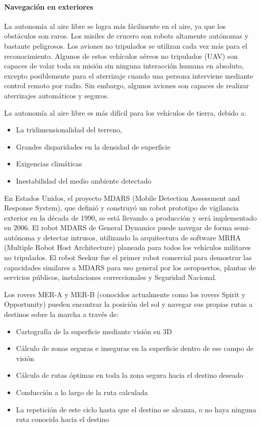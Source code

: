 \paragraph{Navegación en exteriores}
La autonomía al aire libre se logra más fácilmente en el aire, ya que los obstáculos son raros. Los misiles de crucero son robots altamente autónomas y bastante peligrosos. Los aviones no tripulados se utilizan cada vez más para el reconocimiento. Algunos de estos vehículos aéreos no tripulados (UAV) son capaces de volar toda su misión sin ninguna interacción humana en absoluto, excepto posiblemente para el aterrizaje cuando una persona interviene mediante control remoto por radio. Sin embargo, algunos aviones son capaces de realizar aterrizajes automáticos y seguros.

La autonomía al aire libre es más difícil para los vehículos de tierra, debido a:

\begin{itemize}
	\itemsep1pt \parskip1pt 
	\item La tridimensionalidad del terreno,
	\item Grandes disparidades en la densidad de superficie
	\item Exigencias climáticas
	\item Inestabilidad del medio ambiente detectado
\end{itemize}

En Estados Unidos, el proyecto MDARS (Mobile Detection Assessment and Response System), que definió y construyó un robot prototipo de vigilancia exterior en la década de 1990, se está llevando a producción y será implementado en 2006. El robot MDARS de General Dynamics puede navegar de forma semi-autónoma y detectar intrusos, utilizando la arquitectura de software MRHA (Multiple Robot Host Architecture) planeada para todos los vehículos militares no tripulados. El robot Seekur fue el primer robot comercial para demostrar las capacidades similares a MDARS para uso general por los aeropuertos, plantas de servicios públicos, instalaciones correccionales y Seguridad Nacional.

Los rovers MER-A y MER-B (conocidos actualmente como los rovers Spirit y Opportunity) pueden encontrar la posición del sol y navegar sus propias rutas a destinos sobre la marcha a través de:

\begin{itemize}
	\itemsep1pt \parskip1pt 
	\item Cartografía de la superficie mediante visión en 3D
	\item Cálculo de zonas seguras e inseguras en la superficie dentro de ese campo de visión
	\item Cálculo de rutas óptimas en toda la zona segura hacia el destino deseado
	\item Conducción a lo largo de la ruta calculada
	\item La repetición de este ciclo hasta que el destino se alcanza, o no haya ninguna ruta conocida hacia el destino
\end{itemize}

